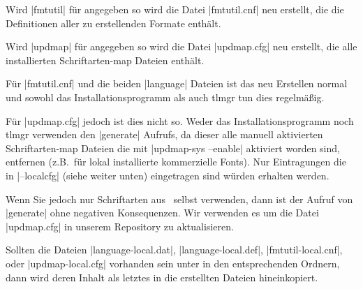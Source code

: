 \begin{itemize}
  Wird |fmtutil| für  angegeben so wird die Datei |fmtutil.cnf|
  neu erstellt, die die Definitionen aller zu erstellenden Formate
  enthält.

  Wird |updmap| für  angegeben so wird die Datei |updmap.cfg|
  neu erstellt, die alle installierten Schriftarten-map Dateien enthält.

  Für |fmtutil.cnf| und die beiden |language| Dateien ist das neu
  Erstellen normal und sowohl das Installationsprogramm als auch tlmgr
  tun dies regelmäßig.

  Für |updmap.cfg| jedoch ist dies nicht so. Weder das Installationsprogramm
  noch tlmgr verwenden den |generate| Aufrufs, da dieser alle manuell
  aktivierten Schriftarten-map Dateien die mit |updmap-sys --enable|
  aktiviert worden sind, entfernen (z.B.\ für lokal installierte
  kommerzielle Fonts). Nur Eintragungen die in |--localcfg| (siehe weiter 
  unten) eingetragen sind würden erhalten werden.

  Wenn Sie jedoch nur Schriftarten aus \tl\ selbst verwenden, dann
  ist der Aufruf von |generate| ohne negativen Konsequenzen. Wir verwenden
  es um die Datei |updmap.cfg| in unserem Repository zu aktualisieren.

  Sollten die Dateien |language-local.dat|, |language-local.def|,
  |fmtutil-local.cnf|, oder |updmap-local.cfg| vorhanden sein unter
   in den entsprechenden Ordnern, dann wird deren
  Inhalt als letztes in die erstellten Dateien hineinkopiert.
\end{itemize}



